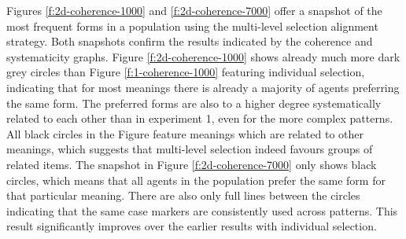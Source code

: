 Figures \ref{f:2d-coherence-1000} and \ref{f:2d-coherence-7000} offer a snapshot of the most frequent forms in a population using the multi-level selection alignment strategy. Both snapshots confirm the results indicated by the coherence and systematicity graphs. Figure \ref{f:2d-coherence-1000} shows already much more dark grey circles than Figure \ref{f:1-coherence-1000} featuring individual selection, indicating that for most meanings there is already a majority of agents preferring the same form. The preferred forms are also to a higher degree systematically related to each other than in experiment 1, even for the more complex patterns. All black circles in the Figure feature meanings which are related to other meanings, which suggests that multi-level selection indeed favours groups of related items. The snapshot in Figure \ref{f:2d-coherence-7000} only shows black circles, which means that all agents in the population prefer the same form for that particular meaning. There are also only full lines between the circles indicating that the same case markers are consistently used across patterns. This result significantly improves over the earlier results with individual selection.
